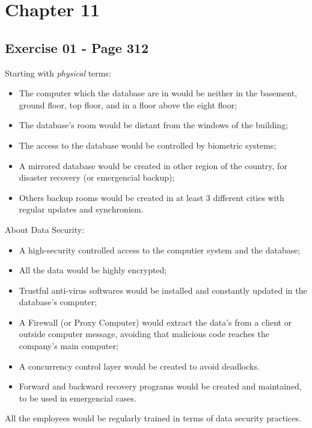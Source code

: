 \chapter{Chapter 11}
	\section{Exercise 01 - Page 312}





		Starting with \emph{physical} terms:

		\begin{itemize}
			\item{The computer which the database are in would be neither in the basement, ground floor, top floor, and in a floor above the eight floor;}
			\item{The database's room would be distant from the windows of the building;}
			\item{The access to the database would be controlled by biometric systems;}
			\item{A mirrored database would be created in other region of the country, for disaster recovery (or emergencial backup);}
			\item{Others backup rooms would be created in at least 3 different cities with regular updates and synchronism.}
		\end{itemize}

		About Data Security:

		\begin{itemize}
			\item{A high-security controlled access to the computier system and the database;}
			\item{All the data would be highly encrypted;}
			\item{Trustful anti-virus softwares would be installed and constantly updated in the database's computer;}
			\item{A Firewall (or Proxy Computer) would extract the data's from a client or outside computer message, avoiding that malicious code reaches the company's main computer;}
			\item{A concurrency control layer would be created to avoid deadlocks.}
			\item{Forward and backward recovery programs would be created and maintained, to be used in emergencial cases.}
		\end{itemize}

		All the employees would be regularly trained in terms of data security practices.
